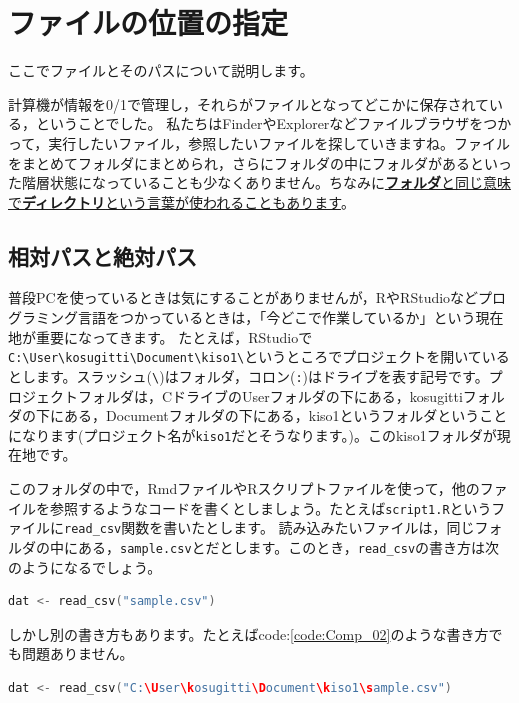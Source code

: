 \documentclass{ltjsbook}
\begin{document}
\section{ファイルの位置の指定}
\label{setLocation}
ここでファイルとそのパスについて説明します。

計算機が情報を0/1で管理し，それらがファイルとなってどこかに保存されている，ということでした。
私たちはFinderやExplorerなどファイルブラウザをつかって，実行したいファイル，参照したいファイルを探していきますね。ファイルをまとめてフォルダにまとめられ，さらにフォルダの中にフォルダがあるといった階層状態になっていることも少なくありません。ちなみに\underline{\textbf{フォルダ}と同じ意味で\textbf{ディレクトリ}という言葉が使われることもあります}。

\subsection{相対パスと絶対パス}
普段PCを使っているときは気にすることがありませんが，RやRStudioなどプログラミング言語をつかっているときは，「今どこで作業しているか」という現在地が重要になってきます。
たとえば，RStudioで\verb|C:\User\kosugitti\Document\kiso1\|というところでプロジェクトを開いているとします。スラッシュ(\verb|\|)はフォルダ，コロン(\verb|:|)はドライブを表す記号です。プロジェクトフォルダは，CドライブのUserフォルダの下にある，kosugittiフォルダの下にある，Documentフォルダの下にある，kiso1というフォルダということになります(プロジェクト名が\texttt{kiso1}だとそうなります。)。このkiso1フォルダが現在地です。

このフォルダの中で，RmdファイルやRスクリプトファイルを使って，他のファイルを参照するようなコードを書くとしましょう。たとえば\verb|script1.R|というファイルに\verb|read_csv|関数を書いたとします。
読み込みたいファイルは，同じフォルダの中にある，\verb|sample.csv|とだとします。このとき，\verb|read_csv|の書き方は次のようになるでしょう。

\begin{lstlisting}[language=c++,label={code:Comp_01},caption={相対パスで読み込む}]
dat <- read_csv("sample.csv")
\end{lstlisting}

しかし別の書き方もあります。たとえばcode:\ref{code:Comp_02}のような書き方でも問題ありません。
\begin{lstlisting}[language=c++,label={code:Comp_02},caption={絶対パスで読み込む}]
dat <- read_csv("C:\User\kosugitti\Document\kiso1\sample.csv")
\end{lstlisting}
\end{document}
